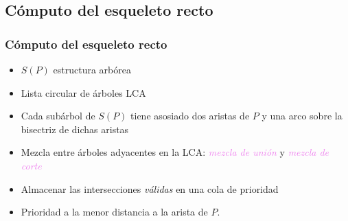 \documentclass[notes=show]{beamer}
\begin{document}
\subsection{C\'omputo del esqueleto recto}

\begin{frame}
\frametitle{C\'omputo del esqueleto recto}
\begin{itemize}
	\item<1-| alert@+>$S(P)$ estructura arb\'orea
	\item<2-| alert@+>Lista circular de \'arboles LCA 
	\item<3-| alert@+>Cada sub\'arbol de $S(P)$ tiene asosiado dos aristas de $P$ y una arco sobre la bisectriz de dichas aristas  
	\item<4-| alert@+>Mezcla entre \'arboles adyacentes en la LCA: \emph{\textcolor{violet}{mezcla de uni\'on}} y \emph{\textcolor{violet}{mezcla de corte}}
	\item<5-| alert@+>Almacenar las intersecciones \emph{v\'alidas} en una cola de prioridad 
	\item<6-| alert@+>Prioridad a la menor distancia a la arista de $P$.
\end{itemize}
\transsplitverticalin[duration=0.4]
\end{frame}
\end{document}
